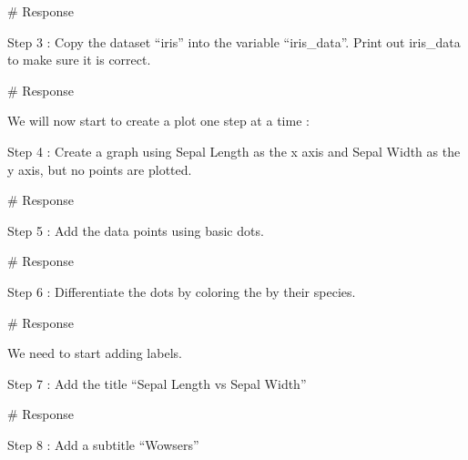 \documentclass[
  letterpaper,
  DIV=11,
  numbers=noendperiod]{scrreprt}
\newenvironment{Shaded}{\begin{snugshade}}{\end{snugshade}}
\newcommand{\CommentTok}[1]{\textcolor[rgb]{0.37,0.37,0.37}{#1}}
\begin{document}
\begin{Shaded}
\begin{Highlighting}[]
\CommentTok{\# Response}
\end{Highlighting}
\end{Shaded}

Step 3 : Copy the dataset ``iris'' into the variable ``iris\_data''.
Print out iris\_data to make sure it is correct.

\begin{Shaded}
\begin{Highlighting}[]
\CommentTok{\# Response}
\end{Highlighting}
\end{Shaded}

We will now start to create a plot one step at a time :

Step 4 : Create a graph using Sepal Length as the x axis and Sepal Width
as the y axis, but no points are plotted.

\begin{Shaded}
\begin{Highlighting}[]
\CommentTok{\# Response}
\end{Highlighting}
\end{Shaded}

Step 5 : Add the data points using basic dots.

\begin{Shaded}
\begin{Highlighting}[]
\CommentTok{\# Response}
\end{Highlighting}
\end{Shaded}

Step 6 : Differentiate the dots by coloring the by their species.

\begin{Shaded}
\begin{Highlighting}[]
\CommentTok{\# Response}
\end{Highlighting}
\end{Shaded}

We need to start adding labels.

Step 7 : Add the title ``Sepal Length vs Sepal Width''

\begin{Shaded}
\begin{Highlighting}[]
\CommentTok{\# Response}
\end{Highlighting}
\end{Shaded}

Step 8 : Add a subtitle ``Wowsers''
\end{document}
